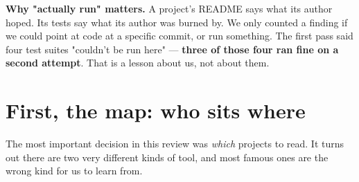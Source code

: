 \documentclass[11pt]{article}
\newcommand{\shout}[1]{\textbf{#1}}
\begin{document}
\begin{plainbox}
\shout{Why "actually run" matters.} A project's README says what its author
hoped. Its tests say what its author was burned by. We only counted a finding if
we could point at code at a specific commit, or run something. The first pass
said four test suites "couldn't be run here" --- \shout{three of those four ran
fine on a second attempt}. That is a lesson about us, not about them.
\end{plainbox}

\newpage
\section{First, the map: who sits where}

The most important decision in this review was \emph{which} projects to read. It
turns out there are two very different kinds of tool, and most famous ones are
the wrong kind for us to learn from.
\end{document}
